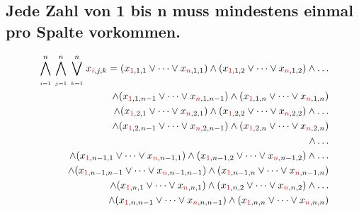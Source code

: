 \documentclass[11pt, a4paper]{article}
\begin{document}
	\subsection{Jede Zahl von 1 bis n muss mindestens einmal pro Spalte vorkommen.}
	\begin{align*}
		\bigwedge_{\atop i=1}^n \bigwedge_{\atop j=1}^n \bigvee_{\atop k=1}^n
		x_{{\color{red} i},j,k} = (x_{{\color{red}1},1,1} \vee \dots \vee x_{{\color{red} n},1,1})
		\wedge (x_{{\color{red} 1},1,2} \vee \dots \vee x_{{\color{red} n},1,2})
		\wedge \dots \\
		\wedge (x_{{\color{red}1},1,n-1} \vee \dots \vee x_{{\color{red} n},1,n-1})
		\wedge (x_{{\color{red} 1},1,n} \vee \dots \vee x_{{\color{red} n},1,n}) \\
		\wedge (x_{{\color{red}1},2,1} \vee \dots \vee x_{{\color{red} n},2,1})
		\wedge (x_{{\color{red} 1},2,2} \vee \dots \vee x_{{\color{red} n},2,2})
		\wedge \dots \\
		\wedge (x_{{\color{red}1},2,n-1} \vee \dots \vee x_{{\color{red} n},2,n-1})
		\wedge (x_{{\color{red} 1},2,n} \vee \dots \vee x_{{\color{red} n},2,n})
		\\ \wedge \dots \\
		\wedge (x_{{\color{red}1},n-1,1} \vee \dots \vee x_{{\color{red} n},n-1,1})
		\wedge (x_{{\color{red} 1},n-1,2} \vee \dots \vee x_{{\color{red} n},n-1,2})
		\wedge \dots \\
		\wedge (x_{{\color{red}1},n-1,n-1} \vee \dots \vee x_{{\color{red} n},n-1,n-1})
		\wedge (x_{{\color{red} 1},n-1,n} \vee \dots \vee x_{{\color{red} n},n-1,n}) \\
		\wedge (x_{{\color{red}1},n,1} \vee \dots \vee x_{{\color{red} n},n,1})
		\wedge (x_{{\color{red} 1},n,2} \vee \dots \vee x_{{\color{red} n},n,2})
		\wedge \dots \\
		\wedge (x_{{\color{red}1},n,n-1} \vee \dots \vee x_{{\color{red} n},n,n-1})
		\wedge (x_{{\color{red} 1},n,n} \vee \dots \vee x_{{\color{red} n},n,n})
	\end{align*}
	\bigskip
	
\end{document}
